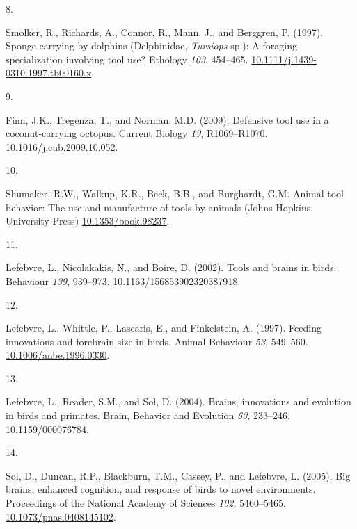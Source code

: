 \documentclass[
  man, donotrepeattitle,floatsintext]{apa6}
\newlength{\cslhangindent}
\newlength{\csllabelwidth}
\newlength{\cslentryspacingunit} %
\newenvironment{CSLReferences}[2] %
 {%
  \setlength{\parindent}{0pt}
  \ifodd #1
  \let\oldpar\par
  \def\par{\hangindent=\cslhangindent\oldpar}
  \fi
  \setlength{\parskip}{#2\cslentryspacingunit}
 }%
 {}
\newcommand{\CSLLeftMargin}[1]{\parbox[t]{\csllabelwidth}{#1}}
\newcommand{\CSLRightInline}[1]{\parbox[t]{\linewidth - \csllabelwidth}{#1}\break}
\begin{document}
\begin{CSLReferences}{0}{0}
\leavevmode{}%
\CSLLeftMargin{8. }%
\CSLRightInline{Smolker, R., Richards, A., Connor, R., Mann, J., and Berggren, P. (1997). Sponge carrying by dolphins ({D}elphinidae, \emph{{T}ursiops} sp.): A foraging specialization involving tool use? Ethology \emph{103}, 454--465. \href{https://doi.org/10.1111/j.1439-0310.1997.tb00160.x}{10.1111/j.1439-0310.1997.tb00160.x}.}

\leavevmode{}%
\CSLLeftMargin{9. }%
\CSLRightInline{Finn, J.K., Tregenza, T., and Norman, M.D. (2009). Defensive tool use in a coconut-carrying octopus. Current Biology \emph{19}, R1069--R1070. \href{https://doi.org/10.1016/j.cub.2009.10.052}{10.1016/j.cub.2009.10.052}.}

\leavevmode{}%
\CSLLeftMargin{10. }%
\CSLRightInline{Shumaker, R.W., Walkup, K.R., Beck, B.B., and Burghardt, G.M. Animal tool behavior: The use and manufacture of tools by animals (Johns Hopkins University Press) \href{https://doi.org/10.1353/book.98237}{10.1353/book.98237}.}

\leavevmode{}%
\CSLLeftMargin{11. }%
\CSLRightInline{Lefebvre, L., Nicolakakis, N., and Boire, D. (2002). Tools and brains in birds. Behaviour \emph{139}, 939--973. \href{https://doi.org/10.1163/156853902320387918}{10.1163/156853902320387918}.}

\leavevmode{}%
\CSLLeftMargin{12. }%
\CSLRightInline{Lefebvre, L., Whittle, P., Lascaris, E., and Finkelstein, A. (1997). Feeding innovations and forebrain size in birds. Animal Behaviour \emph{53}, 549--560. \href{https://doi.org/10.1006/anbe.1996.0330}{10.1006/anbe.1996.0330}.}

\leavevmode{}%
\CSLLeftMargin{13. }%
\CSLRightInline{Lefebvre, L., Reader, S.M., and Sol, D. (2004). Brains, innovations and evolution in birds and primates. Brain, Behavior and Evolution \emph{63}, 233--246. \href{https://doi.org/10.1159/000076784}{10.1159/000076784}.}

\leavevmode{}%
\CSLLeftMargin{14. }%
\CSLRightInline{Sol, D., Duncan, R.P., Blackburn, T.M., Cassey, P., and Lefebvre, L. (2005). Big brains, enhanced cognition, and response of birds to novel environments. Proceedings of the National Academy of Sciences \emph{102}, 5460--5465. \href{https://doi.org/10.1073/pnas.0408145102}{10.1073/pnas.0408145102}.}


\end{CSLReferences}
\end{document}
